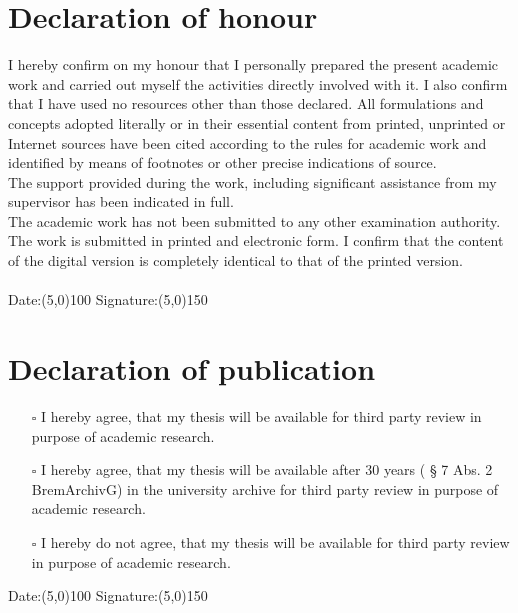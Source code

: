 \section*{Declaration of honour} 

I hereby confirm on my honour that I personally prepared the present academic 
work and carried out myself the activities directly involved with it. I also 
confirm that I have used no resources other than those declared. All formulations 
and concepts adopted literally or in their essential content from printed, unprinted 
or Internet sources have been cited according to the rules for academic work and 
identified by means of footnotes or other precise indications of source.
\\
The support provided during the work, including significant assistance from my
supervisor has been indicated in full.
\\
The academic work has not been submitted to any other examination authority. 
The work is submitted in printed and electronic form. I confirm that the
content of the digital version is completely identical to that of the printed version.\\
\\
Date:\line(5,0){100} \hfill Signature:\line(5,0){150}
\section*{Declaration of publication}
\begin{itemize}
\item[$\square$]I hereby agree, that my thesis will be available for third party review in
purpose of academic research.
\item[$\square$]I hereby agree, that my thesis will be available after 30 years ( § 7 Abs. 2
BremArchivG) in the university archive for third party review in purpose
of academic research.
\item[$\square$]I hereby do not agree, that my thesis will be available for third party
review in purpose of academic research.
\end{itemize}
Date:\line(5,0){100} \hfill Signature:\line(5,0){150}